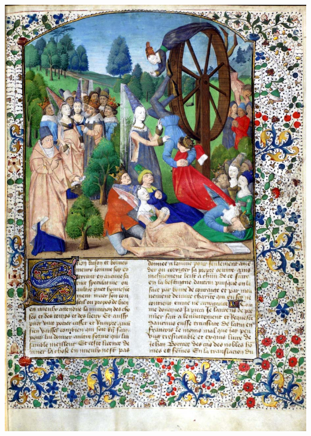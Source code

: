 \documentclass[9pt]{beamer}
\begin{document}
\begin{frame}[fragile]
\begin{center}
    \includegraphics[scale=0.40]{./figs/ForutuneWheel.jpg}
  \end{center}
\end{frame}
\end{document}
